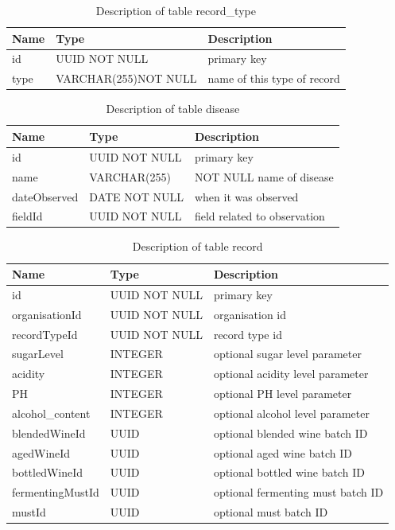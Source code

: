 \begin{table}[th]
	\centering
	\caption{Description of table record\_type}
	\begin{tabular}{|m{}|m{}|m{}|}
		\hline
		Name & Type & Description  \\ \hline
		id & UUID NOT NULL & primary key\\ \hline
		type & VARCHAR(255)\newline NOT NULL & name of this type of record\\ \hline
	\end{tabular}
\end{table}
\begin{table}[th]
	\centering
	\caption{Description of table disease}
	\begin{tabular}{|m{}|m{}|m{}|}
		\hline
		Name & Type & Description  \\ \hline
		id & UUID NOT NULL & primary key \\ \hline
		name & VARCHAR(255) & NOT NULL name of disease \\ \hline
		dateObserved & DATE NOT NULL & when it was observed \\ \hline
		fieldId & UUID NOT NULL & field related to observation \\ \hline
	\end{tabular}
\end{table}

\begin{table}[th]
	\centering
	\caption{Description of table record}
	\begin{tabular}{|m{}|m{}|m{}|}
		\hline
		Name & Type & Description \\ \hline
		id & UUID NOT NULL & primary key\\ \hline
		organisationId & UUID NOT NULL & organisation id\\ \hline
		recordTypeId & UUID NOT NULL & record type id\\ \hline
		sugarLevel & INTEGER & optional sugar level parameter\\ \hline
		acidity & INTEGER & optional acidity level parameter\\ \hline
		PH & INTEGER & optional PH level parameter\\ \hline
		alcohol\_content & INTEGER & optional alcohol level parameter\\ \hline
		blendedWineId & UUID & optional blended wine batch ID\\ \hline
		agedWineId & UUID & optional aged wine batch ID\\ \hline
		bottledWineId & UUID & optional bottled wine batch ID\\ \hline
		fermentingMustId & UUID & optional fermenting must batch ID\\ \hline
		mustId & UUID & optional must batch ID\\ \hline
	\end{tabular}
\end{table}

